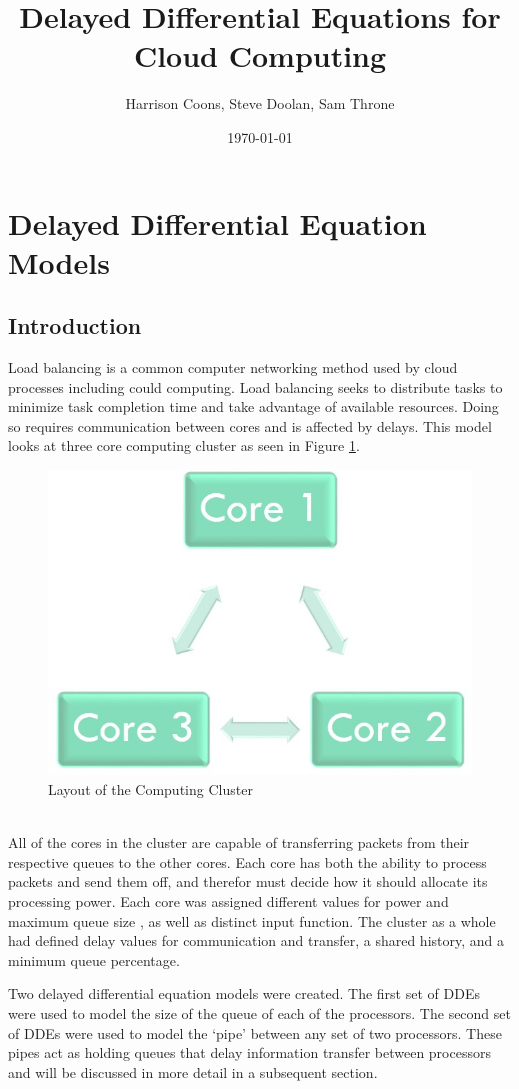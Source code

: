\documentclass{article}
\author{Harrison Coons, Steve Doolan, Sam Throne}
\title{Delayed Differential Equations for Cloud Computing}
\date{\today}
\begin{document}
\maketitle

\section{Delayed Differential Equation Models}
\subsection{Introduction}
Load balancing is a common computer networking method used by cloud processes including could computing. Load balancing seeks to distribute tasks to minimize task completion time and take advantage of available resources. Doing so requires communication between cores and is affected by delays. This model looks at three core computing cluster as seen in Figure \ref{diagram}. 
\begin{figure}[ht]
\begin{center} 
\includegraphics[width=0.4\linewidth]{model.jpg}
\caption{Layout of the Computing Cluster}\label{diagram}
\end{center}
\end{figure}
\\All of the cores in the cluster are capable of transferring packets from their respective queues to the other cores. Each core has both the ability to process packets and send them off, and therefor must decide how it should allocate its processing power. Each core was assigned different values for power and maximum queue size , as well as distinct input function. The cluster as a whole had defined delay values for communication and transfer, a shared  history, and a minimum queue percentage. 



Two delayed differential equation models were created. The first set of DDEs were used to model the size of the queue of each of the processors. The second set of DDEs were used to model the `pipe' between any set of two processors. These pipes act as holding queues that delay information transfer between processors and will be discussed in more detail in a subsequent section.
\end{document}
